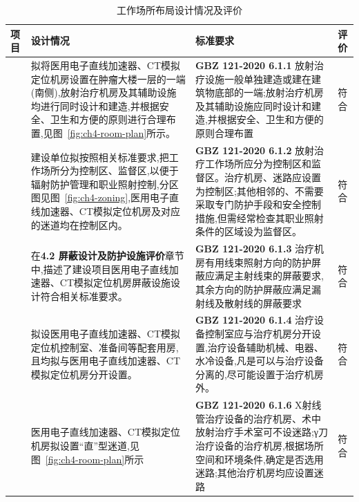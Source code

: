 \begin{table}[H]
\centering
\caption{工作场所布局设计情况及评价}
\label{tab:ch4-layout-eval}
\begin{tabular}{|
>{\centering\arraybackslash}m{2cm}|
>{\centering\arraybackslash}m{6cm}|
>{\centering\arraybackslash}m{6cm}|
>{\centering\arraybackslash}m{1cm}|
}
\hline
项目 & 设计情况 & 标准要求 & 评价 \\
\hline
\multirow{5}{=}{\centering 医用电子直线加速器、CT模拟定位机房}
& \raggedright 拟将医用电子直线加速器、CT模拟定位机房设置在肿瘤大楼一层的一端(南侧),放射治疗机房及其辅助设施均进行同时设计和建造,并根据安全、卫生和方便的原则进行合理布置,见图~\ref{fig:ch4-room-plan}所示。
& \raggedright \textbf{GBZ 121-2020 6.1.1} \newline 放射治疗设施一般单独建造或建在建筑物底部的一端;放射治疗机房及其辅助设施应同时设计和建造,并根据安全、卫生和方便的原则合理布置
& 符合 \\
\cline{2-4}
& \raggedright 建设单位拟按照相关标准要求,把工作场所分为控制区、监督区,以便于辐射防护管理和职业照射控制,分区图见图~\ref{fig:ch4-zoning},医用电子直线加速器、CT模拟定位机房及对应的迷道均在控制区内。
& \raggedright \textbf{GBZ 121-2020 6.1.2} \newline 放射治疗工作场所应分为控制区和监督区。治疗机房、迷路应设置为控制区;其他相邻的、不需要采取专门防护手段和安全控制措施,但需经常检查其职业照射条件的区域设为监督区。
& 符合 \\
\cline{2-4}
& \raggedright 在\textbf{4.2 屏蔽设计及防护设施评价}章节中,描述了建设项目医用电子直线加速器、CT模拟定位机房屏蔽设施设计符合相关标准要求。
& \raggedright \textbf{GBZ 121-2020 6.1.3} \newline 治疗机房有用线束照射方向的防护屏蔽应满足主射线束的屏蔽要求,其余方向的防护屏蔽应满足漏射线及散射线的屏蔽要求
& 符合 \\
\cline{2-4}
& \raggedright 拟设医用电子直线加速器、CT模拟定位机控制室、准备间等配套用房,且均拟与医用电子直线加速器、CT模拟定位机房分开设置。
& \raggedright \textbf{GBZ 121-2020 6.1.4} \newline 治疗设备控制室应与治疗机房分开设置,治疗设备辅助机械、电器、水冷设备,凡是可以与治疗设备分离的,尽可能设置于治疗机房外。
& 符合 \\
\cline{2-4}
& \raggedright 医用电子直线加速器、CT模拟定位机房拟设置“直”型迷道,见图~\ref{fig:ch4-room-plan}所示
& \raggedright \textbf{GBZ 121-2020 6.1.6} \newline X射线管治疗设备的治疗机房、术中放射治疗手术室可不设迷路;γ刀治疗设备的治疗机房,根据场所空间和环境条件,确定是否选用迷路;其他治疗机房均应设置迷路
& 符合 \\
\hline
\end{tabular}
\end{table}


